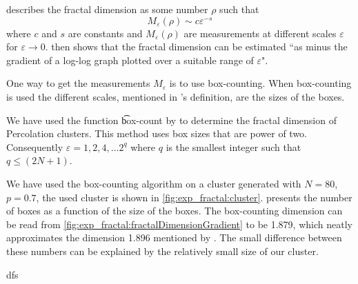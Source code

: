 
\textcite{falconer2004fractal} describes the fractal dimension as some number $\rho$ such that
\begin{equation}
	M_\varepsilon(\rho) \sim c\varepsilon^{-s}
\end{equation}
where $c$ and $s$ are constants and $M_\varepsilon(\rho)$ are measurements at different scales $\varepsilon$ for $\varepsilon \to 0$. \citeauthor{falconer2004fractal} then shows that the fractal dimension can be estimated ``as minus the gradient of a log-log graph plotted over a suitable range of $\varepsilon$"\cite{falconer2004fractal}. 

One way to get the measurements $M_\varepsilon$ is to use box-counting. When box-counting is used the different scales, mentioned in \citeauthor{falconer2004fractal}'s definition, are the sizes of the boxes.

We have used the function \t{box-count} by \textcite{boxCounting} to determine the fractal dimension of Percolation clusters. This method uses box sizes that are power of two. Consequently $\varepsilon = 1, 2, 4, \dotsc 2^q$ where $q$ is the smallest integer such that $q \leq (2N + 1)$. 

We have used the box-counting algorithm on a cluster generated with $N = 80$, $p = 0.7$, the used cluster is shown in \cref{fig:exp_fractal:cluster}.  presents the number of boxes as a function of the size of the boxes. The box-counting dimension can be read from \cref{fig:exp_fractal:fractalDimensionGradient} to be \num{1.879}, which neatly approximates the dimension \num{1.896} mentioned by \textcite{stauffer1994introduction}.  The small difference between these numbers can be explained by the relatively small size of our cluster. 

dfs

